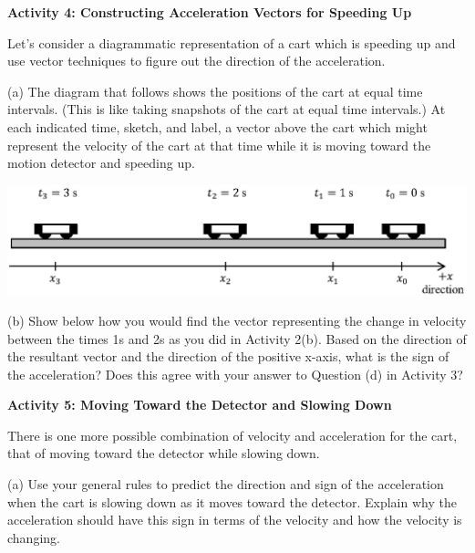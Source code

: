 \pagebreak[2]
\textbf{Activity 4: Constructing Acceleration Vectors for Speeding Up} 

Let's consider a diagrammatic representation of a cart which is speeding up
and use vector techniques to figure out the direction of the acceleration.

(a) The diagram that follows shows the positions of the cart at equal time intervals.
(This is like taking snapshots of the cart at equal time intervals.) At each
indicated time, sketch, and label, a vector above the cart which might represent the velocity
of the cart at that time while it is moving toward the motion detector and speeding
up.

{\par\centering \includegraphics{slowing/carts_speeding.eps} \par}

(b) Show below how you would find the vector representing the change in velocity
between the times 1s and 2s as you did in Activity 2(b). Based on the 
direction of the resultant vector and the direction of the positive x-axis, 
what is the sign of the acceleration? 
Does this agree with your answer to Question (d) in Activity 3?
\vspace{20mm}

\textbf{Activity 5: Moving Toward the Detector and Slowing Down }

There is one more possible combination of velocity and acceleration for the
cart, that of moving toward the detector while slowing down. 


(a) Use your general rules to predict the direction and sign of the acceleration
when the cart is slowing down as it moves toward the detector. Explain why the
acceleration should have this sign in terms of the velocity and how the 
velocity is changing. 
\answerspace{15mm}

